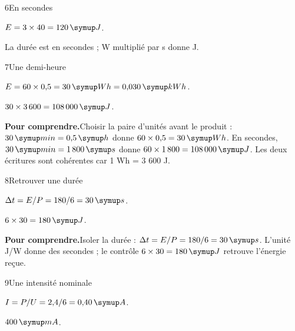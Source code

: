 \par\noindent\begin{minipage}{\linewidth}
\begin{corrige}{6}{En secondes}
\begin{questions}
\item $E=3\times40=120\unite J$.
\item La durée est en secondes ; W multiplié par s donne J.
\end{questions}
\end{corrige}
\end{minipage}
\par\noindent\begin{minipage}{\linewidth}
\begin{corrige}{7}{Une demi-heure}
\begin{questions}
\item $E=60\times0{,}5=30\unite{Wh}=0{,}030\unite{kWh}$.
\item $30\times3\,600=108\,000\unite J$.
\end{questions}
\par\smallskip\noindent\textbf{Pour comprendre.}\enspace Choisir la paire d’unités avant le produit : $30\unite{min}=0{,}5\unite h$ donne $60\times0{,}5=30\unite{Wh}$. En secondes, $30\unite{min}=1\,800\unite s$ donne $60\times1\,800=108\,000\unite J$. Les deux écritures sont cohérentes car 1 Wh = 3 600 J.\par
\end{corrige}
\end{minipage}
\par\noindent\begin{minipage}{\linewidth}
\begin{corrige}{8}{Retrouver une durée}
\begin{questions}
\item $\Delta t=E/P=180/6=30\unite s$.
\item $6\times30=180\unite J$.
\end{questions}
\par\smallskip\noindent\textbf{Pour comprendre.}\enspace Isoler la durée : $\Delta t=E/P=180/6=30\unite s$. L’unité J/W donne des secondes ; le contrôle $6\times30=180\unite J$ retrouve l’énergie reçue.\par
\end{corrige}
\end{minipage}
\par\noindent\begin{minipage}{\linewidth}
\begin{corrige}{9}{Une intensité nominale}
\begin{questions}
\item $I=P/U=2{,}4/6=0{,}40\unite A$.
\item $400\unite{mA}$.
\end{questions}
\end{corrige}
\end{minipage}
